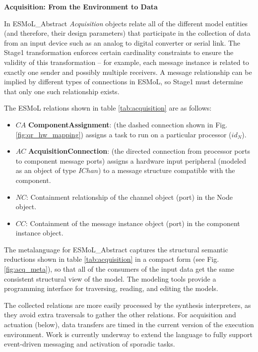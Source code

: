 \textbf{Acquisition: From the Environment to Data}

In ESMoL\_Abstract \emph{Acquisition} objects relate all of the different model entities (and
therefore, their design parameters) that participate in the collection of data
from an input device such as an analog to digital converter or serial link. 
The Stage1 transformation enforces certain cardinality constraints to ensure
the validity of this transformation -- for example, each message instance is 
related to exactly one sender and possibly multiple receivers.  A message 
relationship can be implied by different types of connections in ESMoL, so 
Stage1 must determine that only one such relationship exists.



The ESMoL relations shown in table \ref{tab:acquisition} are as follows:

\begin{itemize}
 \item $CA$ {\bf ComponentAssignment}: (the dashed connection shown in 
Fig. \ref{fig:qr_hw_mapping}) assigns a task to run on a particular 
processor ($id_N$).
 \item $AC$ {\bf AcquisitionConnection}: (the directed connection from 
processor ports to component message ports) assigns a hardware input peripheral
(modeled as an object of type $IChan$) to a message structure compatible with the
component.
 \item $NC$: Containment relationship of the channel object (port) in the Node object.
 \item $CC$: Containment of the message instance object (port) in the component instance object.
\end{itemize}

The metalanguage for ESMoL\_Abstract captures the structural
semantic reductions shown in table \ref{tab:acquisition} in a compact form (see
Fig. \ref{fig:acq_meta}), so that all of the consumers of the input data get the
same consistent structural view of the model.  The modeling tools provide a
programming interface for traversing, reading, and editing the models.



The collected relations are more easily processed by the synthesis interpreters,
as they avoid extra traversals to gather the other relations.  For acquisition 
and actuation (below), data transfers are timed in the current version of the 
execution environment.  Work is currently underway to extend the language to fully 
support event-driven messaging and activation of sporadic tasks.

